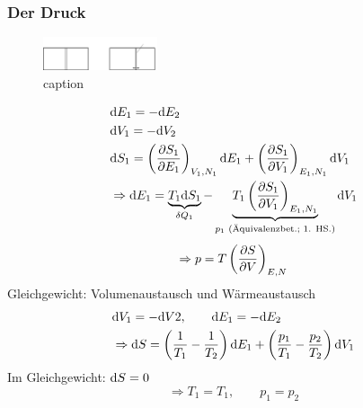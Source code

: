 \subsubsection{Der Druck}
\begin{figure}[H]
    \begin{center}
        \includegraphics[width=0.3\textwidth]{../img/derivationP.pdf}
        \caption{caption}  %
        \label{img:derivatoinP}
    \end{center}
\end{figure}
\begin{equation}
    \begin{split}
        & \mathrm{d} E_1 = - \mathrm{d} E_2 \\
        & \mathrm{d} V_1 = - \mathrm{d} V_2 \\
        & \mathrm{d} S_1 = \left( \frac{\partial S_1}{\partial E_1} \right)_{V_1, N_1} \mathrm{d} E_1 + \left( \frac{\partial S_1}{\partial V_1} \right)_{E_1, N_1} \mathrm{d} V_1 \\
        & \Rightarrow \mathrm{d} E_1 = \underbrace{T_1 \mathrm{d} S_1}_{\delta Q_1} - \underbrace{T_1 \left( \frac{\partial S_1}{\partial V_1} \right)_{E_1, N_1}}_{p_1 \text{ (Äquivalenzbet.; 1. HS.)}} \mathrm{d} V_1
    \end{split}
\end{equation}
\begin{equation}
    \Rightarrow p = T \left( \frac{\partial S}{\partial V} \right)_{E, N}
\end{equation}
Gleichgewicht: Volumenaustausch und Wärmeaustausch
\begin{equation}
    \begin{split}
        & \mathrm{d} V_1 = - \mathrm{d} V2, \qquad \mathrm{d} E_1 = - \mathrm{d} E_2 \\
        & \Rightarrow \mathrm{d} S = \left( \frac{1}{T_1} - \frac{1}{T_2} \right) \mathrm{d} E_1 + \left( \frac{p_1}{T_1} - \frac{p_2}{T_2} \right) \mathrm{d} V_1
    \end{split}
\end{equation}
Im Gleichgewicht: $\mathrm{d} S = 0$
\begin{equation}
    \Rightarrow T_1 = T_1 , \qquad p_1 = p_2
\end{equation}
